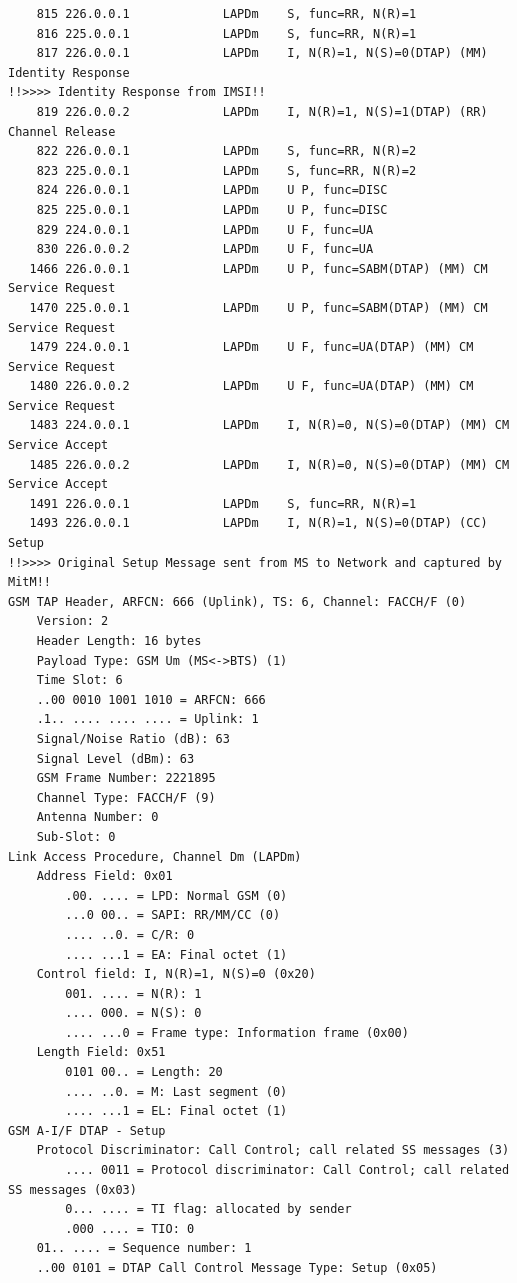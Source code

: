 \begin{lstlisting}
    815 226.0.0.1             LAPDm    S, func=RR, N(R)=1
    816 225.0.0.1             LAPDm    S, func=RR, N(R)=1
    817 226.0.0.1             LAPDm    I, N(R)=1, N(S)=0(DTAP) (MM) Identity Response 
!!>>>> Identity Response from IMSI!!
    819 226.0.0.2             LAPDm    I, N(R)=1, N(S)=1(DTAP) (RR) Channel Release 
    822 226.0.0.1             LAPDm    S, func=RR, N(R)=2
    823 225.0.0.1             LAPDm    S, func=RR, N(R)=2
    824 226.0.0.1             LAPDm    U P, func=DISC
    825 225.0.0.1             LAPDm    U P, func=DISC
    829 224.0.0.1             LAPDm    U F, func=UA
    830 226.0.0.2             LAPDm    U F, func=UA
   1466 226.0.0.1             LAPDm    U P, func=SABM(DTAP) (MM) CM Service Request 
   1470 225.0.0.1             LAPDm    U P, func=SABM(DTAP) (MM) CM Service Request 
   1479 224.0.0.1             LAPDm    U F, func=UA(DTAP) (MM) CM Service Request 
   1480 226.0.0.2             LAPDm    U F, func=UA(DTAP) (MM) CM Service Request 
   1483 224.0.0.1             LAPDm    I, N(R)=0, N(S)=0(DTAP) (MM) CM Service Accept 
   1485 226.0.0.2             LAPDm    I, N(R)=0, N(S)=0(DTAP) (MM) CM Service Accept 
   1491 226.0.0.1             LAPDm    S, func=RR, N(R)=1
   1493 226.0.0.1             LAPDm    I, N(R)=1, N(S)=0(DTAP) (CC) Setup 
!!>>>> Original Setup Message sent from MS to Network and captured by MitM!!
GSM TAP Header, ARFCN: 666 (Uplink), TS: 6, Channel: FACCH/F (0)
    Version: 2
    Header Length: 16 bytes
    Payload Type: GSM Um (MS<->BTS) (1)
    Time Slot: 6
    ..00 0010 1001 1010 = ARFCN: 666
    .1.. .... .... .... = Uplink: 1
    Signal/Noise Ratio (dB): 63
    Signal Level (dBm): 63
    GSM Frame Number: 2221895
    Channel Type: FACCH/F (9)
    Antenna Number: 0
    Sub-Slot: 0
Link Access Procedure, Channel Dm (LAPDm)
    Address Field: 0x01
        .00. .... = LPD: Normal GSM (0)
        ...0 00.. = SAPI: RR/MM/CC (0)
        .... ..0. = C/R: 0
        .... ...1 = EA: Final octet (1)
    Control field: I, N(R)=1, N(S)=0 (0x20)
        001. .... = N(R): 1
        .... 000. = N(S): 0
        .... ...0 = Frame type: Information frame (0x00)
    Length Field: 0x51
        0101 00.. = Length: 20
        .... ..0. = M: Last segment (0)
        .... ...1 = EL: Final octet (1)
GSM A-I/F DTAP - Setup
    Protocol Discriminator: Call Control; call related SS messages (3)
        .... 0011 = Protocol discriminator: Call Control; call related SS messages (0x03)
        0... .... = TI flag: allocated by sender
        .000 .... = TIO: 0
    01.. .... = Sequence number: 1
    ..00 0101 = DTAP Call Control Message Type: Setup (0x05)

\end{lstlisting}
